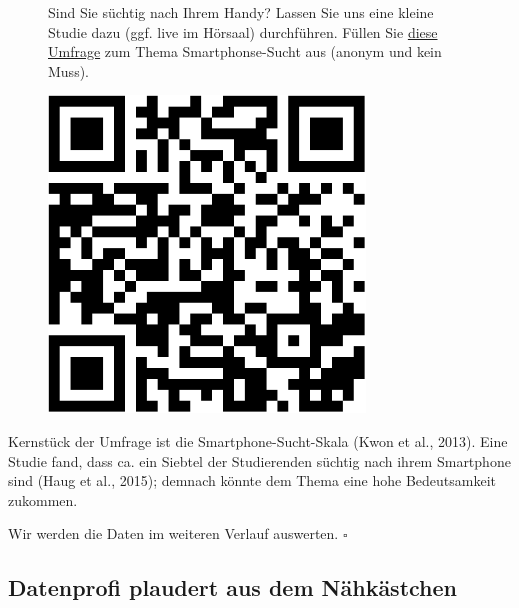 \documentclass[
  a4paper,
]{scrbook}
\theoremstyle{definition}
\theoremstyle{definition}
\theoremstyle{definition}
\theoremstyle{remark}
\begin{document}
\begin{figure}

\begin{minipage}{0.80\linewidth}
Sind Sie süchtig nach Ihrem Handy? Lassen Sie uns eine kleine Studie
dazu (ggf. live im Hörsaal) durchführen. Füllen Sie
\href{https://forms.gle/PP8yb6Ubqq3JU78F9}{diese Umfrage} zum Thema
Smartphonse-Sucht aus (anonym und kein Muss).\end{minipage}%
%
\begin{minipage}{0.20\linewidth}

\begin{center}
\includegraphics[width=0.75\textwidth,height=\textheight]{010-rahmen_files/figure-pdf/unnamed-chunk-26-1.pdf}
\end{center}

\end{minipage}%

\end{figure}%

Kernstück der Umfrage ist die Smartphone-Sucht-Skala (Kwon et al.,
2013). Eine Studie fand, dass ca. ein Siebtel der Studierenden süchtig
nach ihrem Smartphone sind (Haug et al., 2015); demnach könnte dem Thema
eine hohe Bedeutsamkeit zukommen.

Wir werden die Daten im weiteren Verlauf auswerten. \(\square\)

\subsection{Datenprofi plaudert aus dem
Nähkästchen}\label{datenprofi-plaudert-aus-dem-nuxe4hkuxe4stchen}
\end{document}
